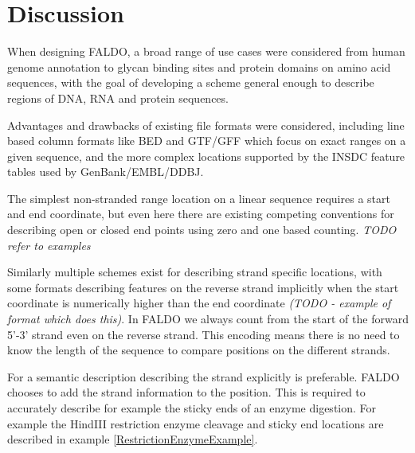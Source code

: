 \section*{Discussion}
When designing FALDO, a broad range of use cases were considered from
human genome annotation to glycan binding sites and protein domains on
amino acid sequences, with the goal of developing a scheme general enough
to describe regions of DNA, RNA and protein sequences.

Advantages and drawbacks of existing file formats were considered, including
line based column formats like BED and GTF/GFF which focus on exact
ranges on a given sequence, and the more complex locations supported
by the INSDC feature tables used by GenBank/EMBL/DDBJ.

The simplest non-stranded range location on a linear sequence requires
a start and end coordinate, but even here there are existing competing
conventions for describing open or closed end points using zero and
one based counting. \textit{TODO refer to examples}

Similarly multiple schemes exist for describing strand specific locations,
with some formats describing features on the reverse strand implicitly
when the start coordinate is numerically higher than the end coordinate
\textit{(TODO - example of format which does this)}.
In FALDO we always count from the start of the forward 5'-3' strand even on the reverse strand.
This encoding means there is no need to know the length of the sequence to compare positions on the different strands.

For a semantic description describing the strand explicitly is preferable.
FALDO chooses to add the strand information to the position. 
This is required to accurately describe for example the sticky ends of an enzyme digestion.
For example the HindIII restriction enzyme cleavage and sticky end locations are described in example \ref{RestrictionEnzymeExample}.

